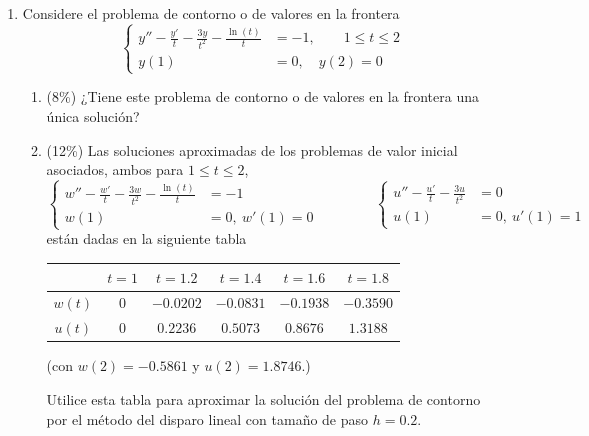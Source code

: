 \documentclass[11pt]{article}
\begin{document}
\begin{enumerate}
\begin{enumerate}
\vspace{5cm}
\end{enumerate}

\item{} Considere el problema de contorno o de valores en la frontera
\[
\left\{
\begin{aligned}
y''-\frac{y'}{t}-\frac{3y}{t^2}-\frac{\ln(t)}{t} &= -1, \qquad 1\leq t\leq 2\\
y(1) &= 0,\quad y(2)=0
\end{aligned}
\right.
\]
\begin{enumerate}
\item{} (8\%) ¿Tiene este problema de contorno o de valores en la frontera una única solución?

\vspace{3cm}

\item{} (12\%) Las soluciones aproximadas de los problemas de valor inicial asociados, ambos para $1\leq t\leq 2$,
\[
\left\{
\begin{aligned}
w''-\frac{w'}{t}-\frac{3w}{t^2}-\frac{\ln(t)}{t} &= -1\\
w(1)&=0,\ w'(1)=0
\end{aligned}
\right.
\qquad\qquad
\left\{
\begin{aligned}
u''-\frac{u'}{t}-\frac{3u}{t^2} &= 0\\
u(1)&=0,\ u'(1)=1
\end{aligned}
\right.
\]
\noindent están dadas en la siguiente tabla

\vspace{6pt}
\begin{center}
\begin{tabular}{|c|c|c|c|c|c|}
\hline
 & $t=1$ & $t=1.2$ & $t=1.4$ & $t=1.6$ & $t=1.8$ \\ \hline
$w(t)$ & $0$ & $-0.0202$ & $-0.0831$ & $-0.1938$ & $-0.3590$ \\ \hline
$u(t)$ & $0$ & $0.2236$ & $0.5073$ & $0.8676$ & $1.3188$ \\ \hline
\end{tabular}
\end{center}
\noindent (con $w(2)=-0.5861$ y $u(2)=1.8746$.)

\noindent Utilice esta tabla para aproximar la solución del problema de contorno por el método del disparo lineal con tamaño de paso $h=0.2$.

\vspace{6cm}
\end{enumerate}


\end{enumerate}
\end{document}
